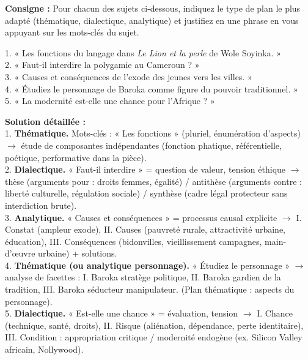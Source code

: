 \documentclass[11pt]{article}
\begin{document}
\begin{exoresolu}
\textbf{Consigne :} Pour chacun des sujets ci-dessous, indiquez le type de plan le plus adapté (thématique, dialectique, analytique) et justifiez en une phrase en vous appuyant sur les mots-clés du sujet.

1. « Les fonctions du langage dans \emph{Le Lion et la perle} de Wole Soyinka. »\\
2. « Faut-il interdire la polygamie au Cameroun ? »\\
3. « Causes et conséquences de l'exode des jeunes vers les villes. »\\
4. « Étudiez le personnage de Baroka comme figure du pouvoir traditionnel. »\\
5. « La modernité est-elle une chance pour l'Afrique ? »

\tcblower
\textbf{Solution détaillée :}\\
1. \textbf{Thématique.} Mots-clés : « Les fonctions » (pluriel, énumération d'aspects) $\rightarrow$ étude de composantes indépendantes (fonction phatique, référentielle, poétique, performative dans la pièce).\\
2. \textbf{Dialectique.} « Faut-il interdire » = question de valeur, tension éthique $\rightarrow$ thèse (arguments pour : droits femmes, égalité) / antithèse (arguments contre : liberté culturelle, régulation sociale) / synthèse (cadre légal protecteur sans interdiction brute).\\
3. \textbf{Analytique.} « Causes et conséquences » = processus causal explicite $\rightarrow$ I. Constat (ampleur exode), II. Causes (pauvreté rurale, attractivité urbaine, éducation), III. Conséquences (bidonvilles, vieillissement campagnes, main-d'œuvre urbaine) + solutions.\\
4. \textbf{Thématique (ou analytique personnage).} « Étudiez le personnage » $\rightarrow$ analyse de facettes : I. Baroka stratège politique, II. Baroka gardien de la tradition, III. Baroka séducteur manipulateur. (Plan thématique : aspects du personnage).\\
5. \textbf{Dialectique.} « Est-elle une chance » = évaluation, tension $\rightarrow$ I. Chance (technique, santé, droits), II. Risque (aliénation, dépendance, perte identitaire), III. Condition : appropriation critique / modernité endogène (ex. Silicon Valley africain, Nollywood).
\end{exoresolu}
\end{document}
